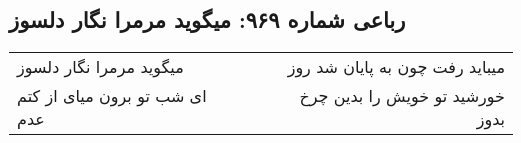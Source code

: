 \begin{center}
\section*{رباعی شماره ۹۶۹: میگوید مرمرا نگار دلسوز}
\label{sec:0969}
\begin{longtable}{l p{0.5cm} r}
میگوید مرمرا نگار دلسوز
&&
میباید رفت چون به پایان شد روز
\\
ای شب تو برون میای از کتم عدم
&&
خورشید تو خویش را بدین چرخ بدوز
\\
\end{longtable}
\end{center}
